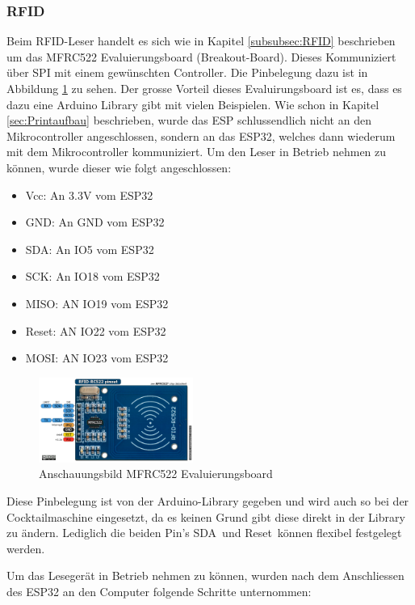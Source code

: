 \subsubsection{RFID}
\label{subsubsec:Inbetriebnahme_RFID}

Beim RFID-Leser handelt es sich wie in Kapitel \ref{subsubsec:RFID} beschrieben um das MFRC522 Evaluierungsboard (Breakout-Board). Dieses Kommuniziert über SPI mit einem gewünschten Controller. Die Pinbelegung dazu ist in Abbildung \ref{fig:MFRC522} zu sehen. Der grosse Vorteil dieses Evaluirungsboard ist es, dass es dazu eine Arduino Library gibt mit vielen Beispielen. Wie schon in Kapitel \ref{sec:Printaufbau} beschrieben, wurde das ESP schlussendlich nicht an den Mikrocontroller angeschlossen, sondern an das ESP32, welches dann wiederum mit dem Mikrocontroller kommuniziert. Um den Leser in Betrieb nehmen zu können, wurde dieser wie folgt angeschlossen:


\begin{itemize}
\item Vcc: An 3.3V vom ESP32
\item GND: An GND vom ESP32
\item SDA: An IO5 vom ESP32
\item SCK: An IO18 vom ESP32
\item MISO: AN IO19 vom ESP32
\item Reset: AN IO22 vom ESP32
\item MOSI: AN IO23 vom ESP32
\end{itemize}

\begin{figure}[h!]
\center
\includegraphics[width = 0.45\textwidth]{graphics/MFRC522}
\caption{Anschauungsbild MFRC522 Evaluierungsboard \cite{nxp_bv_2010_antenna_2010}}
\label{fig:MFRC522}
\end{figure}

Diese Pinbelegung ist von der Arduino-Library gegeben und wird auch so bei der Cocktailmaschine eingesetzt, da es keinen Grund gibt diese direkt in der Library zu ändern. Lediglich die beiden Pin's \flqq SDA\frqq~und \flqq Reset\frqq~können flexibel festgelegt werden.

Um das Lesegerät in Betrieb nehmen zu können, wurden nach dem Anschliessen des ESP32 an den Computer folgende Schritte unternommen: 

